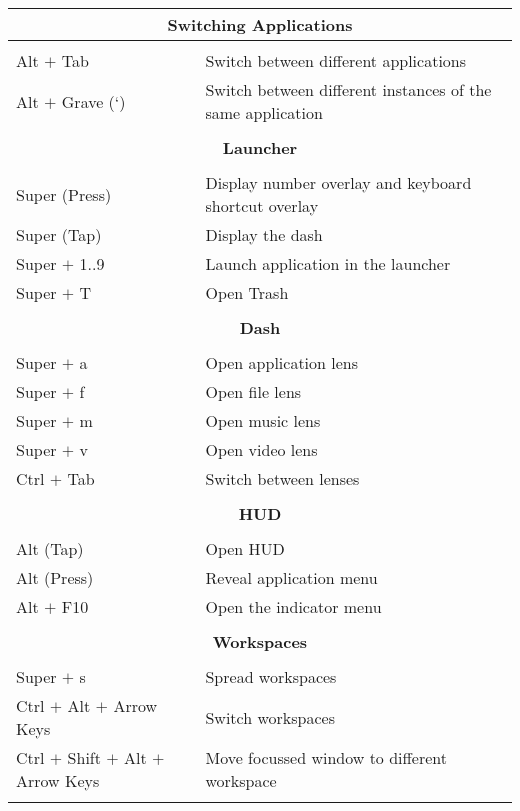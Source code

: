   
\begin{table}[ht!]
	\centering
	\begin{tabular}{|l|p{10cm}|}
	\hline
	\multicolumn{2}{|c|}{\textbf{Switching Applications}} \\
 	\hline
 	& \\
	Alt $+$ Tab 					& Switch between different applications \\
	Alt $+$ Grave (`)		& Switch between different instances of the same application \\
	& \\
	
	\hline 	
 	\multicolumn{2}{|c|}{\textbf{Launcher}} \\
 	\hline
 	& \\
 	Super (Press) 				& Display number overlay and keyboard shortcut overlay \\
 	Super (Tap)					& Display the dash \\
 	Super $+$ 1..9			& Launch application in the launcher \\
 	Super $+$ T					& Open Trash \\ 	
 	& \\
 	
 	\hline 	
 	\multicolumn{2}{|c|}{\textbf{Dash}} \\
 	\hline
    & \\	
 	Super $+$ a					& Open application lens \\
 	Super $+$ f					& Open file lens \\
 	Super $+$ m				& Open music lens \\
 	Super $+$ v					& Open video lens \\
 	Ctrl $+$ Tab				& Switch between lenses \\
 	& \\
 	
 	\hline 	
 	\multicolumn{2}{|c|}{\textbf{HUD}} \\
 	\hline
 	& \\
 	Alt (Tap)						& Open HUD \\
 	Alt (Press)					& Reveal application menu \\
 	Alt $+$ F10					& Open the indicator menu \\
 	& \\
 	
 	\hline 	
 	\multicolumn{2}{|c|}{\textbf{Workspaces}} \\
 	\hline
 	& \\
 	Super $+$ s 														& Spread workspaces \\
 	Ctrl $+$ Alt $+$ Arrow Keys 						& Switch workspaces \\
 	Ctrl $+$ Shift $+$ Alt $+$ Arrow Keys		& Move focussed window to different workspace \\
 	& \\
 	

\end{tabular}
\end{table}
